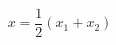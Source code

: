 \begin{equation}                      
x = \frac{1}{2} (x_{1} +x_{2})                       
\end{equation} 
